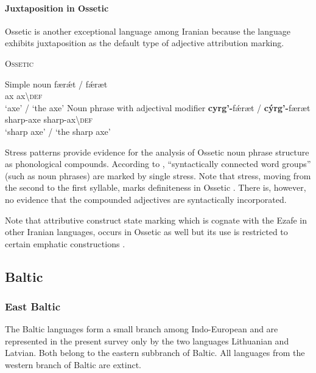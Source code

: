 \paragraph{Juxtaposition in Ossetic}
Ossetic is another exceptional language among Iranian because the language exhibits juxtaposition as the default type of adjective attribution marking.
\begin{exe}
\ex \textsc{Ossetic} \cite[12]{abaev1964} \label{ossetic attrcomp}
\begin{xlist}
\ex	Simple noun
\gll	færǽt / fǽræt\\
	ax { } ax\textbackslash\textsc{def}\\
\glt	‘axe’ / ‘the axe’
\ex	Noun phrase with adjectival modifier
\gll	\textbf{cyrg'-}fǽræt / \textbf{cýrg'-}færæt\\
	sharp-axe { } sharp-ax\textbackslash\textsc{def}\\
\glt	‘sharp axe’ / ‘the sharp axe’
\end{xlist}
\end{exe}
Stress patterns provide evidence for the analysis of Ossetic noun phrase structure as phonological compounds. According to \citet[10]{abaev1964}, “syntactically connected word groups” (such as noun phrases) are marked by single stress. Note that stress, moving from the second to the first syllable, marks definiteness in Ossetic \citep[12]{abaev1964}. There is, however, no evidence that the compounded adjectives are syntactically incorporated.

Note that attributive construct state marking which is cognate with the Ezafe in other Iranian languages, occurs in Ossetic as well but its use is restricted to certain emphatic constructions \cite[467]{thodarson1989}.

\subsection{Baltic} \label{baltic synchr}
\subsubsection{East Baltic}
The Baltic languages form a small branch among Indo-European and are represented in the present survey only by the two languages Lithuanian and Latvian. Both belong to the eastern subbranch of Baltic. All languages from the western branch of Baltic are extinct.

